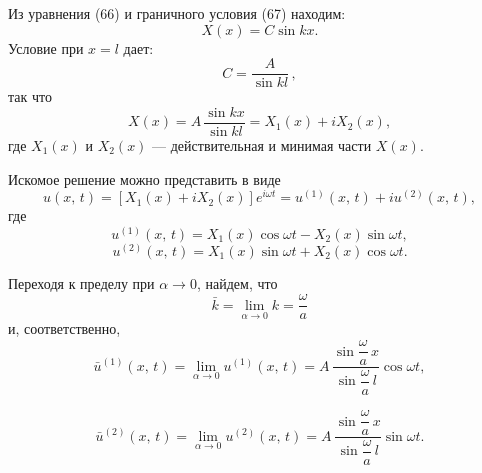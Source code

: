 \documentclass{article}
\begin{document}
Из уравнения (66) и граничного условия (67) находим:
\begin{equation*}
X(x) = C\sin kx.
\end{equation*}
Условие при $x = l$ дает:
\begin{equation*}
C = \frac{A}{\sin kl}\,, \tag{69}
\end{equation*}
так что
\begin{equation*}
X(x) = A\,\frac{\sin kx}{\sin kl} = X_{1}(x) + iX_{2}(x), \tag{70}
\end{equation*}
где $X_{1}(x)$ и $X_{2}(x)$ — действительная и минимая части $X(x)$.

\newpage

\setcounter{page}{108}
\thispagestyle{fancy}
\fancyhf{}
\fancyhead[R]{[ГЛ. II}
\renewcommand{\headrulewidth}{0pt}

Искомое решение можно представить в виде
\begin{equation*}
u(x,\,t) = \left[X_{1}(x) + iX_{2}(x)\right]e^{i\omega t} = u^{(1)}(x,\,t) + iu^{(2)}(x,\,t),
\end{equation*}
где
\begin{equation*}
u^{(1)}(x,\,t) = X_{1}(x)\cos\omega t - X_{2}(x)\sin\omega t,
\end{equation*}
\begin{equation*}
u^{(2)}(x,\,t) = X_{1}(x)\sin\omega t + X_{2}(x)\cos\omega t.
\end{equation*}

Переходя к пределу при $\alpha\to 0$, найдем, что
\begin{equation*}
\bar{k} = \lim_{\alpha\to 0} k = \frac{\omega}{a} \tag{71}
\end{equation*}
и, соответственно,
\begin{equation*}
\bar{u}^{(1)}(x,\,t) = \lim_{\alpha\to 0} u^{(1)}(x,\,t) = A\,\frac{\sin\dfrac{\omega}{a}\,x}{\sin\dfrac{\omega}{a}\,l}\cos\omega t, \tag{72}
\end{equation*}

\begin{equation*}
\bar{u}^{(2)}(x,\,t) = \lim_{\alpha\to 0} u^{(2)}(x,\,t) = A\,\frac{\sin\dfrac{\omega}{a}\,x}{\sin\dfrac{\omega}{a}\,l}\sin\omega t. \tag{73}
\end{equation*}
\end{document}
